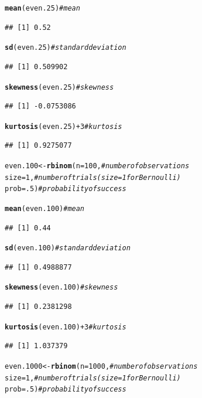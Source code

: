 \documentclass{article}\usepackage[]{graphicx}\usepackage[]{color}
\makeatletter
\newcommand{\hlnum}[1]{\textcolor[rgb]{0.686,0.059,0.569}{#1}}%
\newcommand{\hlcom}[1]{\textcolor[rgb]{0.678,0.584,0.686}{\textit{#1}}}%
\newcommand{\hlopt}[1]{\textcolor[rgb]{0,0,0}{#1}}%
\newcommand{\hlstd}[1]{\textcolor[rgb]{0.345,0.345,0.345}{#1}}%
\newcommand{\hlkwb}[1]{\textcolor[rgb]{0.69,0.353,0.396}{#1}}%
\newcommand{\hlkwc}[1]{\textcolor[rgb]{0.333,0.667,0.333}{#1}}%
\newcommand{\hlkwd}[1]{\textcolor[rgb]{0.737,0.353,0.396}{\textbf{#1}}}%
\newenvironment{kframe}{%
 \def\at@end@of@kframe{}%
 \ifinner\ifhmode%
  \def\at@end@of@kframe{\end{minipage}}%
  \begin{minipage}{\columnwidth}%
 \fi\fi%
 \def\FrameCommand##1{\hskip\@totalleftmargin \hskip-\fboxsep
 \colorbox{shadecolor}{##1}\hskip-\fboxsep
     \hskip-\linewidth \hskip-\@totalleftmargin \hskip\columnwidth}%
 \MakeFramed {\advance\hsize-\width
   \@totalleftmargin\z@ \linewidth\hsize
   \@setminipage}}%
 {\par\unskip\endMakeFramed%
 \at@end@of@kframe}
\newenvironment{knitrout}{}{} %
\makeatother
\begin{document}
\begin{enumerate}
\begin{enumerate}
\begin{knitrout}
\begin{kframe}
\begin{alltt}
\hlkwd{mean}\hlstd{(even.25)}                    \hlcom{#mean}
\end{alltt}
\begin{verbatim}
## [1] 0.52
\end{verbatim}
\begin{alltt}
\hlkwd{sd}\hlstd{(even.25)}                      \hlcom{#standard deviation}
\end{alltt}
\begin{verbatim}
## [1] 0.509902
\end{verbatim}
\begin{alltt}
\hlkwd{skewness}\hlstd{(even.25)}                \hlcom{#skewness}
\end{alltt}
\begin{verbatim}
## [1] -0.0753086
\end{verbatim}
\begin{alltt}
\hlkwd{kurtosis}\hlstd{(even.25)}\hlopt{+}\hlnum{3}              \hlcom{#kurtosis}
\end{alltt}
\begin{verbatim}
## [1] 0.9275077
\end{verbatim}
\begin{alltt}
\hlstd{even.100} \hlkwb{<-} \hlkwd{rbinom}\hlstd{(}\hlkwc{n}\hlstd{=}\hlnum{100}\hlstd{,}        \hlcom{#number of observations}
              \hlkwc{size}\hlstd{=}\hlnum{1}\hlstd{,}            \hlcom{#number of trials (size=1 for Bernoulli)}
              \hlkwc{prob}\hlstd{=}\hlnum{.5}\hlstd{)}           \hlcom{#probability of success}

\hlkwd{mean}\hlstd{(even.100)}                   \hlcom{#mean}
\end{alltt}
\begin{verbatim}
## [1] 0.44
\end{verbatim}
\begin{alltt}
\hlkwd{sd}\hlstd{(even.100)}                     \hlcom{#standard deviation}
\end{alltt}
\begin{verbatim}
## [1] 0.4988877
\end{verbatim}
\begin{alltt}
\hlkwd{skewness}\hlstd{(even.100)}               \hlcom{#skewness}
\end{alltt}
\begin{verbatim}
## [1] 0.2381298
\end{verbatim}
\begin{alltt}
\hlkwd{kurtosis}\hlstd{(even.100)}\hlopt{+}\hlnum{3}             \hlcom{#kurtosis}
\end{alltt}
\begin{verbatim}
## [1] 1.037379
\end{verbatim}
\begin{alltt}
\hlstd{even.1000} \hlkwb{<-} \hlkwd{rbinom}\hlstd{(}\hlkwc{n}\hlstd{=}\hlnum{1000}\hlstd{,}      \hlcom{#number of observations}
              \hlkwc{size}\hlstd{=}\hlnum{1}\hlstd{,}            \hlcom{#number of trials (size=1 for Bernoulli)}
              \hlkwc{prob}\hlstd{=}\hlnum{.5}\hlstd{)}           \hlcom{#probability of success}


\end{alltt}
\end{kframe}
\end{knitrout}
\end{enumerate}
\end{enumerate}
\end{document}
